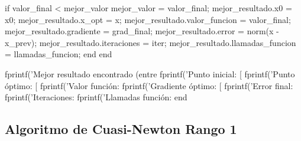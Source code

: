 \begin{matlab}
        if valor_final < mejor_valor
            mejor_valor = valor_final;
            mejor_resultado.x0 = x0;
            mejor_resultado.x_opt = x;
            mejor_resultado.valor_funcion = valor_final;
            mejor_resultado.gradiente = grad_final;
            mejor_resultado.error = norm(x - x_prev);
            mejor_resultado.iteraciones = iter;
            mejor_resultado.llamadas_funcion = llamadas_funcion;
        end
    end

    fprintf('Mejor resultado encontrado (entre %
    fprintf('Punto inicial:      [%
    fprintf('Punto óptimo:       [%
    fprintf('Valor función:      %
    fprintf('Gradiente óptimo:   [%
    fprintf('Error final:        %
    fprintf('Iteraciones:        %
    fprintf('Llamadas función:   %
end
\end{matlab}
\subsection{Algoritmo de Cuasi-Newton Rango 1}


